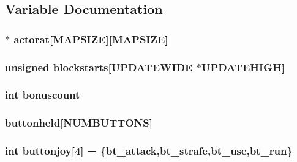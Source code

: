 \subsection{Variable Documentation}
\hypertarget{WL__PLAY_8C_a8b6c7ec70ee351719afac0dd216445c7}{
\subsubsection[{actorat}]{$\ast$ {\bf actorat}\mbox{[}MAPSIZE\mbox{]}\mbox{[}MAPSIZE\mbox{]}}}
\label{WL__PLAY_8C_a8b6c7ec70ee351719afac0dd216445c7}
\hypertarget{WL__PLAY_8C_a55e89f395ced8a12eba2634336292526}{
\subsubsection[{blockstarts}]{\setlength{\rightskip}{0pt plus 5cm}unsigned {\bf blockstarts}\mbox{[}UPDATEWIDE $\ast$UPDATEHIGH\mbox{]}}}
\label{WL__PLAY_8C_a55e89f395ced8a12eba2634336292526}
\hypertarget{WL__PLAY_8C_a3b8983c4cb5a8c78246addd30658d896}{
\subsubsection[{bonuscount}]{\setlength{\rightskip}{0pt plus 5cm}int {\bf bonuscount}}}
\label{WL__PLAY_8C_a3b8983c4cb5a8c78246addd30658d896}
\hypertarget{WL__PLAY_8C_a0c7b9b3b7a3c5a984902f52507d194ab}{
\subsubsection[{buttonheld}]{ {\bf buttonheld}\mbox{[}NUMBUTTONS\mbox{]}}}
\label{WL__PLAY_8C_a0c7b9b3b7a3c5a984902f52507d194ab}
\hypertarget{WL__PLAY_8C_a7d53efcab80b501943d05e6f82ca1b61}{
\subsubsection[{buttonjoy}]{\setlength{\rightskip}{0pt plus 5cm}int {\bf buttonjoy}\mbox{[}4\mbox{]} = \{bt\_\-attack,bt\_\-strafe,bt\_\-use,bt\_\-run\}}}
